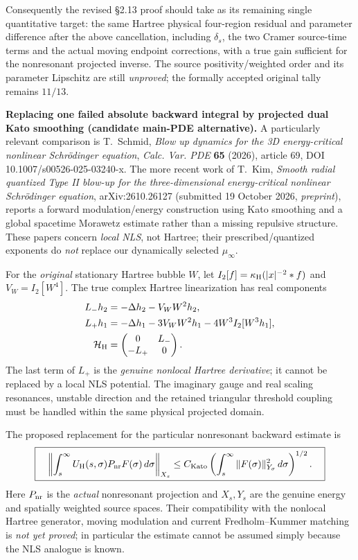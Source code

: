 \documentclass[11pt]{amsart}
\begin{document}
Consequently the revised §2.13 proof should
take as its remaining single quantitative target:
the same Hartree physical four-region residual and
parameter difference after the above cancellation,
including \(\delta_s\), the two Cramer source-time
terms and the actual moving endpoint corrections,
with a true gain sufficient for the nonresonant
projected inverse. The source positivity/weighted
order and its parameter Lipschitz are still
\emph{unproved}; the formally accepted original
tally remains \(11/13\).



\medskip
\noindent\textbf{Replacing one failed absolute backward integral by
projected dual Kato smoothing (candidate main-PDE alternative).}
A particularly relevant comparison is T.~Schmid,
\emph{Blow up dynamics for the 3D energy-critical nonlinear
Schr\"odinger equation}, \emph{Calc. Var. PDE} \textbf{65}
(2026), article 69,
DOI 10.1007/s00526-025-03240-x.
The more recent work of T.~Kim,
\emph{Smooth radial quantized Type II blow-up for the
three-dimensional energy-critical nonlinear Schr\"odinger
equation}, arXiv:2610.26127 (submitted 19 October 2026,
\emph{preprint}), reports a forward modulation/energy
construction using Kato smoothing and a global spacetime
Morawetz estimate rather than a missing repulsive structure.
These papers concern \emph{local NLS}, not Hartree;
their prescribed/quantized exponents do \emph{not}
replace our dynamically selected \(\mu_\infty\).

For the \emph{original} stationary Hartree bubble \(W\), let
\(I_2[f]=\kappa_{\rm H}(|x|^{-2}*f)\) and \(V_W=I_2[W^4]\).
The true complex Hartree linearization has real components
\[
 \begin{aligned}
 L_-h_2&=-\Delta h_2-V_WW^2h_2,\\
 L_+h_1&=-\Delta h_1-3V_WW^2h_1
           -4W^3I_2[W^3h_1],\\
 \mathcal H_{\rm H}
   &=\begin{pmatrix}0&L_-\\-L_+&0\end{pmatrix}.
 \end{aligned}
\]
The last term of \(L_+\) is the \emph{genuine
nonlocal Hartree derivative}; it cannot be
replaced by a local NLS potential. The imaginary
gauge and real scaling resonances, unstable
direction and the retained triangular threshold
coupling must be handled within the same
physical projected domain.

The proposed replacement for the particular
nonresonant backward estimate is
\[
 \boxed{\quad
 \left\|\int_s^\infty
 U_{\rm H}(s,\sigma)P_{\rm nr}F(\sigma)\,d\sigma
 \right\|_{X_s}
 \le C_{\rm Kato}
 \left(\int_s^\infty
  \|F(\sigma)\|_{Y_\sigma}^2\,d\sigma\right)^{1/2}.
 \quad}
\]
Here \(P_{\rm nr}\) is the \emph{actual}
nonresonant projection and \(X_s,Y_s\) are
the genuine energy and spatially weighted source
spaces. Their compatibility with the nonlocal
Hartree generator, moving modulation and
current Fredholm--Kummer matching is
\emph{not yet proved}; in particular the
estimate cannot be assumed simply because
the NLS analogue is known.
\end{document}
